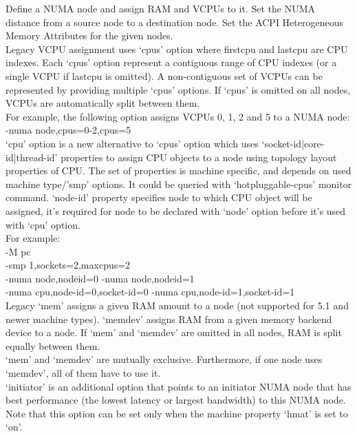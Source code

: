 \documentclass[11pt, a4paper, oneside]{article}
\theoremstyle{definition}
\begin{document}
    Define a NUMA node and assign RAM and VCPUs to it. Set the NUMA distance from a source node to a destination node. Set the ACPI Heterogeneous Memory Attributes for the given nodes.\\

    Legacy VCPU assignment uses ‘cpus’ option where firstcpu and lastcpu are CPU indexes. Each ‘cpus’ option represent a contiguous range of CPU indexes (or a single VCPU if lastcpu is omitted). A non-contiguous set of VCPUs can be represented by providing multiple ‘cpus’ options. If ‘cpus’ is omitted on all nodes, VCPUs are automatically split between them.\\

    For example, the following option assigns VCPUs 0, 1, 2 and 5 to a NUMA node:\\

    -numa node,cpus=0-2,cpus=5\\

    ‘cpu’ option is a new alternative to ‘cpus’ option which uses ‘socket-id|core-id|thread-id’ properties to assign CPU objects to a node using topology layout properties of CPU. The set of properties is machine specific, and depends on used machine type/’smp’ options. It could be queried with ‘hotpluggable-cpus’ monitor command. ‘node-id’ property specifies node to which CPU object will be assigned, it’s required for node to be declared with ‘node’ option before it’s used with ‘cpu’ option.\\

    For example:\\

    -M pc \\
    -smp 1,sockets=2,maxcpus=2 \\
    -numa node,nodeid=0 -numa node,nodeid=1 \\
    -numa cpu,node-id=0,socket-id=0 -numa cpu,node-id=1,socket-id=1\\

    Legacy ‘mem’ assigns a given RAM amount to a node (not supported for 5.1 and newer machine types). ‘memdev’ assigns RAM from a given memory backend device to a node. If ‘mem’ and ‘memdev’ are omitted in all nodes, RAM is split equally between them.\\

    ‘mem’ and ‘memdev’ are mutually exclusive. Furthermore, if one node uses ‘memdev’, all of them have to use it.\\

    ‘initiator’ is an additional option that points to an initiator NUMA node that has best performance (the lowest latency or largest bandwidth) to this NUMA node. Note that this option can be set only when the machine property ‘hmat’ is set to ‘on’.\\
\end{document}
